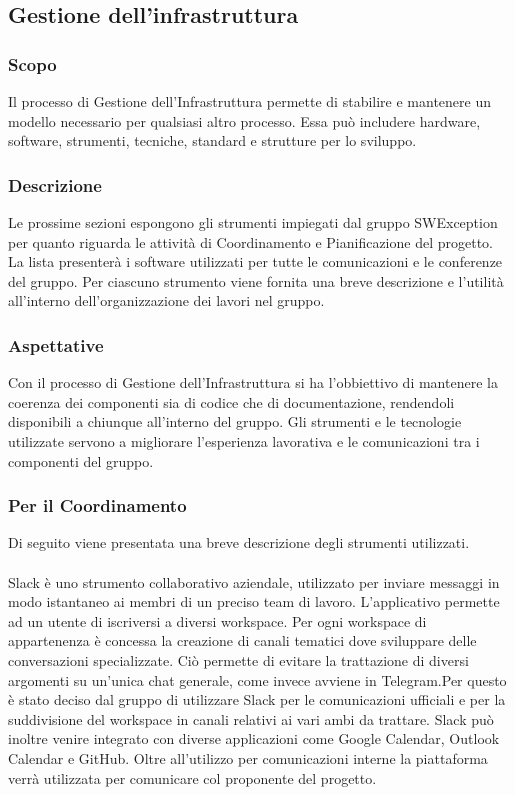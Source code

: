 \subsection{Gestione dell'infrastruttura} \label{_gestioneInfrastruttura}
\subsubsection{Scopo}
Il processo di Gestione dell’Infrastruttura permette di stabilire e mantenere un modello necessario per qualsiasi altro processo. Essa può includere hardware, software, strumenti, tecniche, standard e strutture per lo sviluppo.

\subsubsection{Descrizione}
Le prossime sezioni espongono gli strumenti impiegati dal gruppo SWException per quanto riguarda le attività di Coordinamento e Pianificazione del progetto. La lista presenterà i software utilizzati per tutte le comunicazioni e le conferenze del gruppo. Per ciascuno strumento viene fornita una breve descrizione e l'utilità all'interno dell'organizzazione dei lavori nel gruppo.

\subsubsection{Aspettative}
Con il processo di Gestione dell’Infrastruttura si ha l'obbiettivo di mantenere la coerenza dei componenti sia di codice che di documentazione, rendendoli disponibili a chiunque all'interno del gruppo. Gli strumenti e le tecnologie utilizzate servono a migliorare l'esperienza lavorativa e le comunicazioni tra i componenti del gruppo.


\subsubsection{Per il Coordinamento}
Di seguito viene presentata una breve descrizione degli strumenti utilizzati.

\paragraph{}
Slack è uno strumento collaborativo aziendale, utilizzato per inviare messaggi in modo istantaneo ai membri di un preciso team di lavoro. L’applicativo permette ad un utente di iscriversi
a diversi workspace. Per ogni workspace di appartenenza è concessa la creazione di canali
tematici dove sviluppare delle conversazioni specializzate. Ciò permette di evitare la trattazione di diversi argomenti su un’unica chat generale, come invece avviene in Telegram.Per questo è stato deciso dal gruppo di utilizzare Slack per le comunicazioni ufficiali e per la suddivisione del workspace in canali relativi ai vari ambi da trattare. Slack può inoltre venire integrato con diverse applicazioni come Google Calendar, Outlook Calendar e GitHub. Oltre all'utilizzo per comunicazioni interne la piattaforma verrà utilizzata per comunicare col proponente del progetto.

